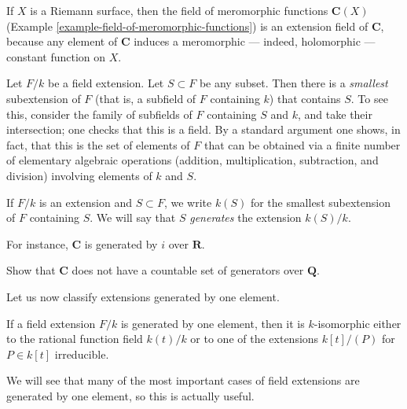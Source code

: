 \begin{example}
\label{example-field-of-meromorphic-functions-extension-C}
If $X$ is a Riemann surface, then the field of meromorphic functions
$\mathbf{C}(X)$ (Example \ref{example-field-of-meromorphic-functions})
is an extension field of $\mathbf{C}$, because any element of $\mathbf{C}$
induces a meromorphic --- indeed, holomorphic --- constant function on $X$.
\end{example}

\noindent
Let $F/k$ be a field extension. Let $S \subset F$ be any subset.
Then there is a {\it smallest} subextension of $F$ (that is, a subfield of
$F$ containing $k$) that contains $S$. To see this, consider the family of
subfields of $F $ containing $S$ and $k$, and take their intersection; one
checks that this is a field. By a standard argument one shows, in fact, that
this is the set of elements of $F$ that can be obtained via a finite number
of elementary algebraic operations (addition, multiplication, subtraction,
and division) involving elements of $k$ and $S$.

\begin{definition}
\label{definition-generated-by}
If $F/k$ is an extension and $S \subset F$, we write $k(S)$ for the smallest
subextension of $F$ containing $S$. We will say that $S$ {\it generates} the
extension $k(S)/k$.
\end{definition}

\noindent
For instance, $\mathbf{C}$ is generated by $i$ over $\mathbf{R}$.

\begin{exercise}
\label{exercise-C-not-countably-generated}
Show that $\mathbf{C}$ does not have a countable set of generators over
$\mathbf{Q}$.
\end{exercise}

\noindent
Let us now classify extensions generated by one element.

\begin{lemma}
\label{lemma-field-extension-generated-by-one-element}
If a field extension $F/k$ is generated by one element, then it is
$k$-isomorphic either to the rational function field $k(t)/k$ or to one
of the extensions $k[t]/(P)$ for $P \in k[t]$ irreducible.
\end{lemma}

\noindent
We will see that many of the most important cases of field extensions are
generated by one element, so this is actually useful.


